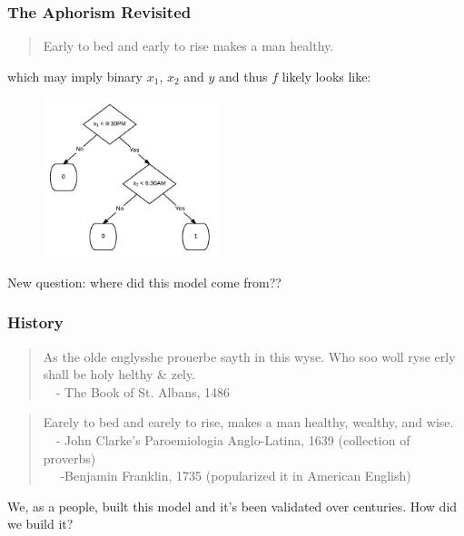 \documentclass[handout]{beamer}
\begin{document}
\begin{frame}\frametitle{The Aphorism Revisited}

\small
\begin{quotation}
Early to bed and early to rise makes a man healthy.
\end{quotation}

which may imply binary $x_1$, $x_2$ and $y$ and thus $f$ likely looks like:

\begin{figure}
\centering
\includegraphics[width=2in]{simple_health}
\end{figure}

New question: where did this model come from??
	
\end{frame}

\begin{frame}\frametitle{History}

\begin{quotation}
As the olde englysshe prouerbe sayth in this wyse. Who soo woll ryse erly shall be holy helthy \& zely.\\
~~- The Book of St. Albans, 1486
\end{quotation}
	
\begin{quotation}
Earely to bed and earely to rise, makes a man healthy, wealthy, and wise. \\
~~- John Clarke's Paroemiologia Anglo-Latina, 1639 (collection of proverbs) \\
~~ -Benjamin Franklin, 1735 (popularized it in American English)
\end{quotation}

We, as a people, built this model and it's been validated over centuries. How did we build it?

\end{frame}
\end{document}
